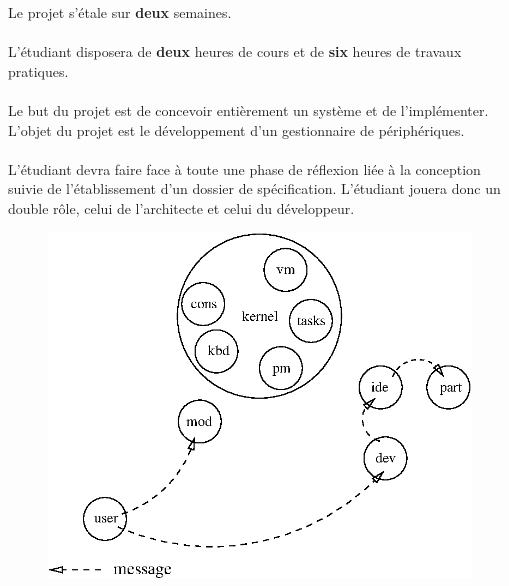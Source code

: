 \documentclass[10pt,a4wide]{article}
\begin{document}
Le projet s'\'etale sur \textbf{deux} semaines.

\paragraph{}

L'\'etudiant disposera de \textbf{deux} heures de cours et de \textbf{six}
heures de travaux pratiques.

\paragraph{}

Le but du projet est de concevoir enti\`erement un syst\`eme et de
l'impl\'ementer. L'objet du projet est le d\'eveloppement d'un gestionnaire
de p\'eriph\'eriques.

\paragraph{}

L'\'etudiant devra faire face \`a toute une phase de r\'eflexion li\'ee
\`a la conception suivie de l'\'etablissement d'un dossier de sp\'ecification.
L'\'etudiant jouera donc un double r\^ole, celui de l'architecte et celui
du d\'eveloppeur.

\vspace{5cm}

\begin{figure}[h]
\centerline{\includegraphics{figures/k7.eps}}
\end{figure}
\end{document}
